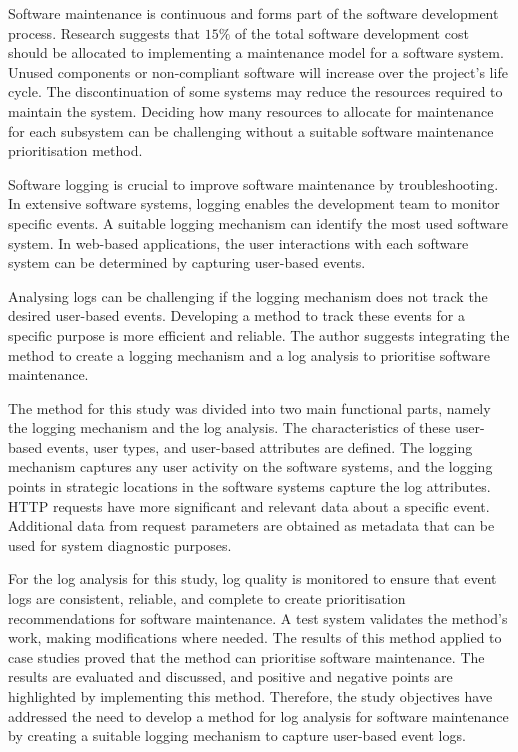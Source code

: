 Software maintenance is continuous and forms part of the software development process. Research suggests that $15\%$ of the total software development cost should be allocated to implementing a maintenance model for a software system. Unused components or non-compliant software will increase over the project's life cycle. The discontinuation of some systems may reduce the resources required to maintain the system. Deciding how many resources to allocate for maintenance for each subsystem can be challenging without a suitable software maintenance prioritisation method. \par Software logging is crucial to improve software maintenance by troubleshooting. In extensive software systems, logging enables the development team to monitor specific events. A suitable logging mechanism can identify the most used software system. In web-based applications, the user interactions with each software system can be determined by capturing user-based events. \par Analysing logs can be challenging if the logging mechanism does not track the desired user-based events. Developing a method to track these events for a specific purpose is more efficient and reliable. The author suggests integrating the method to create a logging mechanism and a log analysis to prioritise software maintenance. \par The method for this study was divided into two main functional parts, namely the logging mechanism and the log analysis. The characteristics of these user-based events, user types, and user-based attributes are defined. The logging mechanism captures any user activity on the software systems, and the logging points in strategic locations in the software systems capture the log attributes. HTTP requests have more significant and relevant data about a specific event. Additional data from request parameters are obtained as metadata that can be used for system diagnostic purposes. \par For the log analysis for this study, log quality is monitored to ensure that event logs are consistent, reliable, and complete to create prioritisation recommendations for software maintenance. A test system validates the method's work, making modifications where needed. The results of this method applied to case studies proved that the method can prioritise software maintenance. The results are evaluated and discussed, and positive and negative points are highlighted by implementing this method. Therefore, the study objectives have addressed the need to develop a method for log analysis for software maintenance by creating a suitable logging mechanism to capture user-based event logs.
